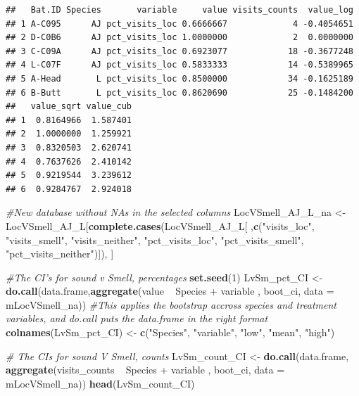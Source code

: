 \documentclass[]{article}
\newenvironment{Shaded}{\begin{snugshade}}{\end{snugshade}}
\newcommand{\KeywordTok}[1]{\textcolor[rgb]{0.13,0.29,0.53}{\textbf{{#1}}}}
\newcommand{\DataTypeTok}[1]{\textcolor[rgb]{0.13,0.29,0.53}{{#1}}}
\newcommand{\DecValTok}[1]{\textcolor[rgb]{0.00,0.00,0.81}{{#1}}}
\newcommand{\StringTok}[1]{\textcolor[rgb]{0.31,0.60,0.02}{{#1}}}
\newcommand{\CommentTok}[1]{\textcolor[rgb]{0.56,0.35,0.01}{\textit{{#1}}}}
\newcommand{\NormalTok}[1]{{#1}}
\begin{document}
\begin{verbatim}
##   Bat.ID Species       variable     value visits_counts  value_log
## 1 A-C095      AJ pct_visits_loc 0.6666667             4 -0.4054651
## 2 D-C0B6      AJ pct_visits_loc 1.0000000             2  0.0000000
## 3 C-C09A      AJ pct_visits_loc 0.6923077            18 -0.3677248
## 4 L-C07F      AJ pct_visits_loc 0.5833333            14 -0.5389965
## 5 A-Head       L pct_visits_loc 0.8500000            34 -0.1625189
## 6 B-Butt       L pct_visits_loc 0.8620690            25 -0.1484200
##   value_sqrt value_cub
## 1  0.8164966  1.587401
## 2  1.0000000  1.259921
## 3  0.8320503  2.620741
## 4  0.7637626  2.410142
## 5  0.9219544  3.239612
## 6  0.9284767  2.924018
\end{verbatim}

\begin{Shaded}
\begin{Highlighting}[]
\CommentTok{#New database without NAs in the selected columns}
\NormalTok{LocVSmell_AJ_L_na <-}\StringTok{ }\NormalTok{LocVSmell_AJ_L[}\KeywordTok{complete.cases}\NormalTok{(LocVSmell_AJ_L[ ,}\KeywordTok{c}\NormalTok{(}\StringTok{"visits_loc"}\NormalTok{, }\StringTok{"visits_smell"}\NormalTok{,  }\StringTok{"visits_neither"}\NormalTok{, }\StringTok{"pct_visits_loc"}\NormalTok{, }\StringTok{"pct_visits_smell"}\NormalTok{, }\StringTok{"pct_visits_neither"}\NormalTok{)]), ]}

\CommentTok{#The CI's for sound v Smell, percentages}
\KeywordTok{set.seed}\NormalTok{(}\DecValTok{1}\NormalTok{)}
\NormalTok{LvSm_pct_CI <-}\StringTok{ }\KeywordTok{do.call}\NormalTok{(data.frame,}\KeywordTok{aggregate}\NormalTok{(value ~}\StringTok{ }\NormalTok{Species +}\StringTok{ }\NormalTok{variable , boot_ci, }\DataTypeTok{data =} \NormalTok{mLocVSmell_na)) }\CommentTok{#This applies the bootstrap accross species and treatment variables, and do.call puts the data.frame in the right format}
\KeywordTok{colnames}\NormalTok{(LvSm_pct_CI) <-}\StringTok{ }\KeywordTok{c}\NormalTok{(}\StringTok{"Species"}\NormalTok{, }\StringTok{"variable"}\NormalTok{, }\StringTok{"low"}\NormalTok{, }\StringTok{"mean"}\NormalTok{, }\StringTok{"high"}\NormalTok{)}

\CommentTok{# The CIs for sound V Smell, counts}
\NormalTok{LvSm_count_CI <-}\StringTok{ }\KeywordTok{do.call}\NormalTok{(data.frame, }\KeywordTok{aggregate}\NormalTok{(visits_counts ~}\StringTok{ }\NormalTok{Species +}\StringTok{ }\NormalTok{variable , boot_ci, }\DataTypeTok{data =} \NormalTok{mLocVSmell_na))}
\KeywordTok{head}\NormalTok{(LvSm_count_CI)}
\end{Highlighting}
\end{Shaded}
\end{document}

